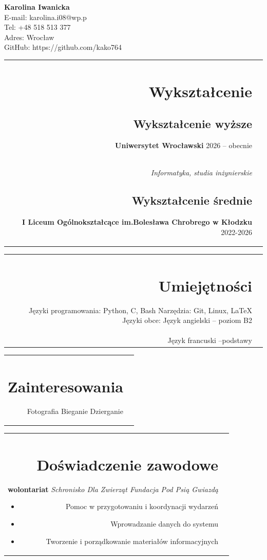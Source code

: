\documentclass[a4paper]{article}
\begin{document}
\begin{center}
{\LARGE \textbf{Karolina Iwanicka}} \\ 
E-mail: karolina.i08@wp.p\\
Tel: +48 518 513 377 \\
Adres: Wrocław\\
GitHub: https://github.com/kako764
\end{center}


\begin{tabular}{rr}
\section{Wykształcenie}
\toprule
\subsection{Wykształcenie wyższe}
\textbf{Uniwersytet Wrocławski} \hfill {2026 -- obecnie} \\
\textit{Informatyka, studia inżynierskie}
\midrule
\subsection{Wykształcenie średnie}
\textbf{I Liceum Ogólnokształcące im.Bolesława Chrobrego w Kłodzku} \hfill {2022-2026} \\
\bottomrule
\end{tabular}


\begin{tabular}{rr}
\section{Umiejętności}
\toprule
Języki programowania: Python, C, Bash 
\midrule
Narzędzia: Git, Linux, LaTeX 
\midrule
Języki obce: Język angielski -- poziom B2 \\
                    Język francuski --podstawy
\bottomrule
\end{tabular}

\begin{tabular}{rr}
\section{Zainteresowania}
\toprule
Fotografia
\midrule
Bieganie
\midrule
Dzierganie
\bottomrule
\end{tabular}

\begin{tabular}{rr}
\section{Doświadczenie zawodowe}
\toprule
\textbf{wolontariat}
\textit{Schronisko Dla Zwierząt Fundacja Pod Psią Gwiazdą}
\begin{itemize}
\item Pomoc w przygotowaniu i koordynacji wydarzeń
\item Wprowadzanie danych do systemu
\item Tworzenie i porządkowanie materiałów informacyjnych
\end{itemize}
\bottomrule
\end{tabular}
\end{document}
